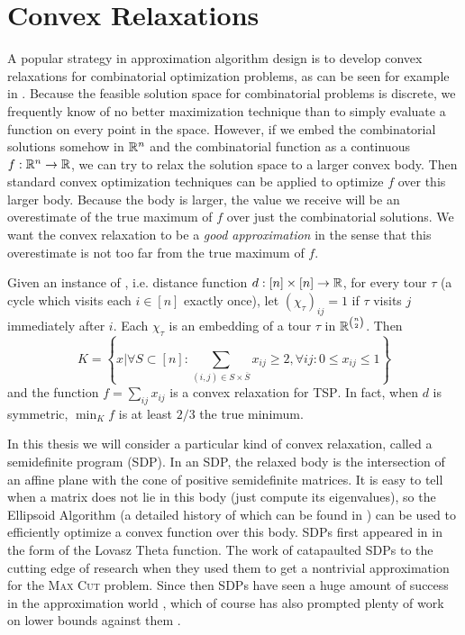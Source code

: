 \section{Convex Relaxations}
A popular strategy in approximation algorithm design is to develop convex relaxations for combinatorial optimization problems, as can be seen for example in \cite{GW95,ARV09,Li13,VY99}. 
Because the feasible solution space for combinatorial problems is discrete, we frequently know of no better maximization technique than to simply evaluate a function on every point in the space. However, if we embed the combinatorial solutions somehow in $\mathbb R^n$ and the combinatorial function as a continuous $f: \mathbb R^n \rightarrow \mathbb R$, we can try to relax the solution space to a larger convex body. Then standard convex optimization techniques can be applied to optimize $f$ over this larger body. Because the body is larger, the value we receive will be an overestimate of the true maximum of $f$ over just the combinatorial solutions. We want the convex relaxation to be a \emph{good approximation} in the sense that this overestimate is not too far from the true maximum of $f$. 
\begin{example}
Given an instance of , i.e. distance function $d: [n] \times [n] \rightarrow \mathbb R$, for every tour $\tau$ (a cycle which visits each $i \in [n]$ exactly once), let $(\chi_\tau)_{ij} = 1$ if $\tau$ visits $j$ immediately after $i$. Each $\chi_\tau$ is an embedding of a tour $\tau$ in $\mathbb R^{\binom{n}{2}}$. Then 
\[K = \left\{x | \forall S \subset [n]: \sum_{(i,j) \in S \times \overline{S}} x_{ij} \geq 2, \forall ij: 0 \leq x_{ij} \leq 1\right\}\]
and the function $f = \sum_{ij} x_{ij}$ is a convex relaxation for \textsc{TSP}. In fact, when $d$ is symmetric, $\min_K f$ is at least $2/3$ the true minimum. 
\end{example}

In this thesis we will consider a particular kind of convex relaxation, called a semidefinite program (SDP). In an SDP, the relaxed body is the intersection of an affine plane with the cone of positive semidefinite matrices. It is easy to tell when a matrix does not lie in this body (just compute its eigenvalues), so the Ellipsoid Algorithm (a detailed history of which can be found in \cite{Akg84}) can be used to efficiently optimize a convex function over this body. SDPs first appeared in \cite{Lovasz79} in the form of the Lovasz Theta function. The work of \cite{GW95} catapaulted SDPs to the cutting edge of research when they used them to get a nontrivial approximation for the \textsc{Max Cut} problem. Since then SDPs have seen a huge amount of success in the approximation world \cite{ARV09,TS15,PW07,Kar09,CMM09,Chlam07,FJ97,HZ99,Ragh08}, which of course has also prompted plenty of work on lower bounds against them \cite{BPZ15,LRS15,BCVVZ12,RS09,BDP15}. 

